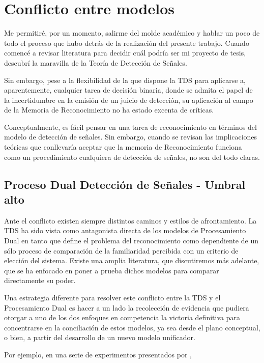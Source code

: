 \section{Conflicto entre modelos}

Me permitiré, por un momento, salirme del molde académico y hablar un poco de todo el proceso que hubo detrás de la realización del presente trabajo. Cuando comencé a revisar literatura para decidir cuál podría ser mi proyecto de tesis, descubrí la maravilla de la Teoría de Detección de Señales. 

Sin embargo, pese a la flexibilidad de la que dispone la TDS para aplicarse a, aparentemente, cualquier tarea de decisión binaria, donde se admita el papel de la incertidumbre en la emisión de un juicio de detección, su aplicación al campo de la Memoria de Reconocimiento no ha estado excenta de críticas.

Conceptualmente, es fácil pensar en una tarea de reconocimiento en términos del modelo de detección de señales. Sin embargo, cuando se revisan las implicaciones teóricas que conllevaría aceptar que la memoria de Reconocimiento funciona como un procedimiento cualquiera de detección de señales, no son del todo claras. 

\subsection{Proceso Dual Detección de Señales - Umbral alto}

Ante el conflicto existen siempre distintos caminos y estilos de afrontamiento. La TDS ha sido vista como antagonista directa de los modelos de Procesamiento Dual en tanto que define el problema del reconocimiento como dependiente de un sólo proceso de comparación de la familiaridad percibida con un criterio de elección del sistema. Existe una amplia literatura, que discutiremos más adelante, que se ha enfocado en poner a prueba dichos modelos para comparar directamente su poder.

Una estrategia diferente para resolver este conflicto entre la TDS y el Procesamiento Dual es hacer a un lado la recolección de evidencia que pudiera otorgar a uno de los dos enfoques en competencia la victoria definitiva para concentrarse en la conciliación de estos modelos, ya sea desde el plano conceptual, o bien, a partir del desarrollo de un nuevo modelo unificador.

Por ejemplo, en una serie de experimentos presentados por \parencite{Atkinson1973}, 



